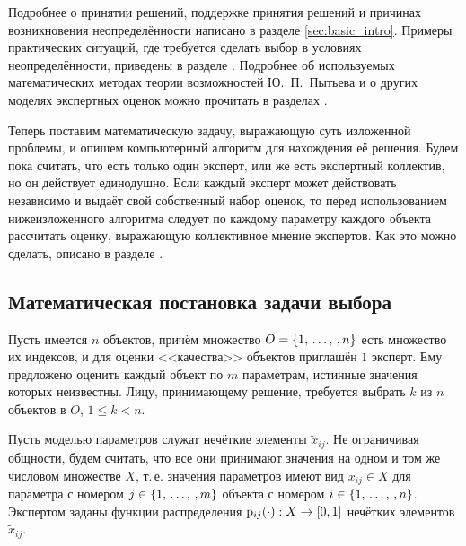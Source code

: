Подробнее о принятии решений, поддержке принятия решений и причинах возникновения неопределённости написано в разделе \ref{sec:basic_intro}. Примеры практических ситуаций, где требуется сделать выбор в условиях неопределённости, приведены в разделе {}. Подробнее об используемых математических методах теории возможностей Ю.~П.~Пытьева и о других моделях экспертных оценок можно прочитать в разделах {}.

Теперь поставим математическую задачу, выражающую суть изложенной проблемы, и опишем компьютерный алгоритм для нахождения её решения. Будем пока считать, что есть только один эксперт, или же есть экспертный коллектив, но он действует единодушно. Если каждый эксперт может действовать независимо и выдаёт свой собственный набор оценок, то перед использованием нижеизложенного алгоритма следует по каждому параметру каждого объекта рассчитать оценку, выражающую коллективное мнение экспертов. Как это можно сделать, описано в разделе {}.

\subsection{Математическая постановка задачи выбора}

Пусть имеется $n$ объектов, причём множество $O = \{1, \, \ldots,\,, n\}$ есть множество их индексов, и для оценки <<качества>> объектов приглашён $1$ эксперт. Ему предложено оценить каждый объект по $m$ параметрам, истинные значения которых неизвестны. Лицу, принимающему решение, требуется  выбрать $k$ из $n$ объектов в $O$, $1 \leq k < n$.

Пусть моделью параметров служат нечёткие элементы $\tilde x_{ij}$. Не ограничивая общности, будем считать, что все они принимают значения на одном и том же числовом множестве $X$, т.\,е. значения параметров имеют вид $x_{ij} \in X$ для параметра с номером $j \in \{1, \, \ldots,\,, m\}$ объекта с номером $i \in \{1, \, \ldots,\,, n\}$. Экспертом заданы функции распределения ${\mathrm{p}}_{ij}(\cdot): X \rightarrow [0,1]$ нечётких элементов $\tilde x_{ij}$. 

